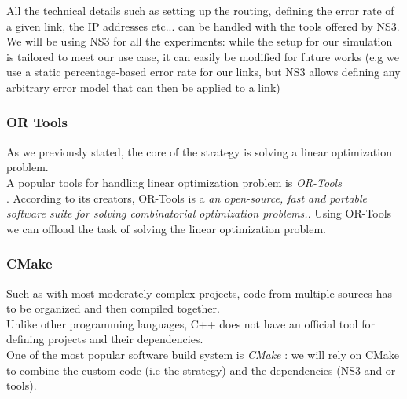 All the technical details such as setting up the routing, defining the error rate of a given link, the IP addresses etc... can be handled with the tools offered by NS3. \\

We will be using NS3 for all the experiments: while the setup for our simulation is tailored to meet our use case, it can easily be modified for future works (e.g we use a static percentage-based error rate for our links, but NS3 allows defining any arbitrary error model that can then be applied to a link)


\subsubsection{OR Tools}
As we previously stated, the core of the strategy is solving a linear optimization problem. \\
A popular tools for handling linear optimization problem is \textit{OR-Tools} \cite{or-tools} \\.
According to its creators, OR-Tools is a \textit{an open-source, fast and portable software suite for solving combinatorial optimization problems.}.
Using OR-Tools we can offload the task of solving the linear optimization problem.

\subsubsection{CMake}
Such as with most moderately complex projects, code from multiple sources has to be organized and then compiled together. \\ 
Unlike other programming languages, C++ does not have an official tool for defining projects and their dependencies.\\
One of the most popular software build system is \textit{CMake} \cite{ns3}: we will rely on CMake to combine the custom code (i.e the strategy) and the dependencies (NS3 and or-tools). \\



